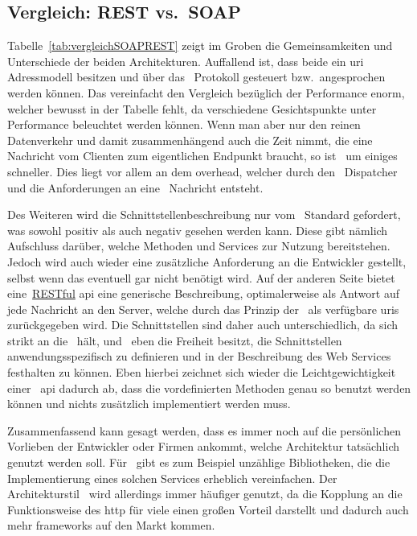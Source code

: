 \subsection{Vergleich: REST vs.\ SOAP}\label{subsec:vergleich:-rest-vs.-soap}
	Tabelle~\ref{tab:vergleichSOAPREST} zeigt im Groben
	die Gemeinsamkeiten und Unterschiede der beiden Architekturen.
	Auffallend ist,
	dass beide ein \gls{uri} Adressmodell besitzen
	und über das~ Protokoll gesteuert bzw.\ angesprochen werden können.
	Das vereinfacht den Vergleich bezüglich der Performance enorm,
	welcher bewusst in der Tabelle fehlt,
	da verschiedene Gesichtspunkte unter Performance beleuchtet werden können.
	Wenn man aber nur den reinen Datenverkehr und damit zusammenhängend auch die Zeit nimmt,
	die eine Nachricht vom Clienten zum eigentlichen Endpunkt braucht,
	so ist~ um einiges schneller.
	Dies liegt vor allem an dem \gls{overhead},
	welcher durch den~ Dispatcher und
	die Anforderungen an eine~ Nachricht entsteht.

	Des Weiteren wird die Schnittstellenbeschreibung nur vom~ Standard gefordert,
	was sowohl positiv als auch negativ gesehen werden kann.
	Diese gibt nämlich Aufschluss darüber,
	welche Methoden und Services zur Nutzung bereitstehen.
	Jedoch wird auch wieder eine zusätzliche Anforderung an die Entwickler gestellt,
	selbst wenn das eventuell gar nicht benötigt wird.
	Auf der anderen Seite bietet eine~\hyperref[subsec:rest]{RESTful} \gls{api} eine generische Beschreibung,
	optimalerweise als Antwort auf jede Nachricht an den Server,
	welche durch das Prinzip der~ als verfügbare \glspl{uri} zurückgegeben wird.
	Die Schnittstellen sind daher auch unterschiedlich,
	da sich~ strikt an die~ hält,
	und~ eben die Freiheit besitzt,
	die Schnittstellen anwendungsspezifisch zu definieren und
	in der Beschreibung des Web Services festhalten zu können.
	Eben hierbei zeichnet sich wieder die Leichtgewichtigkeit
	einer~ \gls{api} dadurch ab,
	dass die vordefinierten Methoden genau so benutzt werden können
	und nichts zusätzlich implementiert werden muss.

	Zusammenfassend kann gesagt werden,
	dass es immer noch auf die persönlichen Vorlieben der Entwickler oder Firmen ankommt,
	welche Architektur tatsächlich genutzt werden soll.
	Für~ gibt es zum Beispiel unzählige Bibliotheken,
	die die Implementierung eines solchen Services erheblich vereinfachen.
	Der Architekturstil~ wird allerdings immer häufiger genutzt,
	da die Kopplung an die Funktionsweise des \gls{http} für viele einen großen Vorteil darstellt
	und dadurch auch mehr \glspl{framework} auf den Markt kommen.